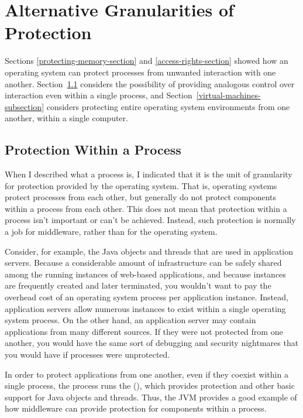 \section{Alternative Granularities of Protection}\label{protection-granularities-section}

Sections \ref{protecting-memory-section} and
\ref{access-rights-section} showed how an operating system can protect
processes from unwanted interaction with one another.
Section~\ref{protection-within-a-process} considers the
possibility of providing analogous control over interaction even
within a single process, and
Section~\ref{virtual-machines-subsection} considers protecting entire
operating system environments from one another, within a single
computer.

\subsection{Protection Within a Process}
\label{protection-within-a-process}

When I described what a process is, I indicated that it is the unit
of granularity for protection provided by the operating system.  That
is, operating systems protect processes from each other, but generally
do not protect components within a process from each other.  This does
not mean that protection within a process isn't important or can't be
achieved. Instead, such protection is normally a job for middleware, rather
than for the operating system.

Consider, for example, the Java objects and threads that are used in application
servers.  Because a considerable amount of infrastructure can be safely shared
among the running instances of
web-based applications, and because instances are frequently created and later terminated,
you wouldn't want to pay the overhead cost of an
operating system process per application instance.  Instead, application servers
allow numerous instances to exist
within a single operating system process.  On the other hand, an
application server may contain applications
from many different sources.  If they were not protected from one
another, you would have the same sort of debugging and security
nightmares that you would have if processes were unprotected.

In order to protect applications from one another, even if they
coexist within a single process, the process runs the  (), which provides protection and other
basic support for Java objects and threads.  Thus, the JVM provides a good example
of how middleware can provide protection for components within a
process.


